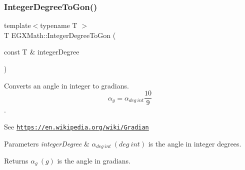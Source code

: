 \subsubsection{\texorpdfstring{Integer\+Degree\+To\+Gon()}{IntegerDegreeToGon()}}
{\footnotesize\ttfamily template$<$typename T $>$ \\
T E\+G\+X\+Math\+::\+Integer\+Degree\+To\+Gon (\begin{DoxyParamCaption}\item[{const T \&}]{integer\+Degree }\end{DoxyParamCaption})}



Converts an angle in integer to gradians. \[\alpha_{g}=\alpha_{deg\ int}\frac{10}{9}\]. 

See \href{https://en.wikipedia.org/wiki/Gradian}{\tt https\+://en.\+wikipedia.\+org/wiki/\+Gradian} 
\begin{DoxyParams}{Parameters}
{\em integer\+Degree} & $\alpha_{deg\ int}\ (deg\ int)$ is the angle in integer degrees. \\
\hline
\end{DoxyParams}
\begin{DoxyReturn}{Returns}
$\alpha_{g}\ (g)$ is the angle in gradians. 
\end{DoxyReturn}
